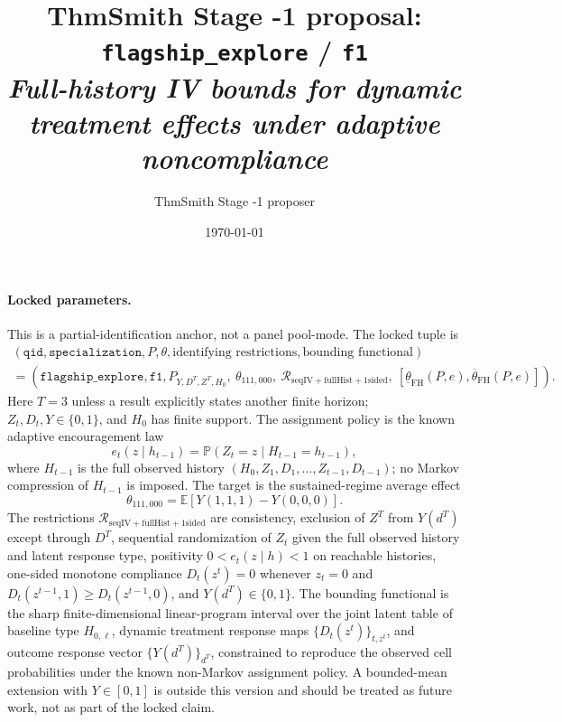 \documentclass[11pt]{article}
\title{ThmSmith Stage -1 proposal: \texttt{flagship\_explore} / \texttt{f1}%
  \\ \large\textit{Full-history IV bounds for dynamic treatment effects under adaptive noncompliance}}
\author{ThmSmith Stage -1 proposer}
\date{\today}
\newcommand{\E}{\mathbb{E}}
\renewcommand{\Pr}{\mathbb{P}}
\theoremstyle{definition}
\theoremstyle{plain}
\theoremstyle{remark}
\begin{document}
\maketitle


\paragraph{Locked parameters.}
This is a partial-identification anchor, not a panel pool-mode.  The locked tuple is
\[
\begin{gathered}
(\texttt{qid},\texttt{specialization},P,\theta,\text{identifying restrictions},
  \text{bounding functional})\\
=
(\texttt{flagship\_explore},\texttt{f1},
  P_{Y,D^T,Z^T,H_0},\ \theta_{111,000},\
  \mathcal{R}_{\mathrm{seqIV+fullHist+1sided}},\
  [\underline\theta_{\mathrm{FH}}(P,e),\overline\theta_{\mathrm{FH}}(P,e)]) .
\end{gathered}
\]
Here \(T=3\) unless a result explicitly states another finite horizon; \(Z_t,D_t,Y\in\{0,1\}\), and \(H_0\) has finite support.  The assignment policy is the known adaptive encouragement law
\[
e_t(z\mid h_{t-1})=\Pr(Z_t=z\mid H_{t-1}=h_{t-1}),
\]
where \(H_{t-1}\) is the full observed history \((H_0,Z_1,D_1,\ldots,Z_{t-1},D_{t-1})\); no Markov compression of \(H_{t-1}\) is imposed.  The target is the sustained-regime average effect
\[
\theta_{111,000}=\E[Y(1,1,1)-Y(0,0,0)].
\]
The restrictions \(\mathcal{R}_{\mathrm{seqIV+fullHist+1sided}}\) are consistency, exclusion of \(Z^T\) from \(Y(d^T)\) except through \(D^T\), sequential randomization of \(Z_t\) given the full observed history and latent response type, positivity \(0<e_t(z\mid h)<1\) on reachable histories, one-sided monotone compliance \(D_t(z^t)=0\) whenever \(z_t=0\) and \(D_t(z^{t-1},1)\ge D_t(z^{t-1},0)\), and \(Y(d^T)\in\{0,1\}\).  The bounding functional is the sharp finite-dimensional linear-program interval over the joint latent table of baseline type \(H_{0,\ell}\), dynamic treatment response maps \(\{D_t(z^t)\}_{t,z^t}\), and outcome response vector \(\{Y(d^T)\}_{d^T}\), constrained to reproduce the observed cell probabilities under the known non-Markov assignment policy.  A bounded-mean extension with \(Y\in[0,1]\) is outside this version and should be treated as future work, not as part of the locked claim.
\end{document}
